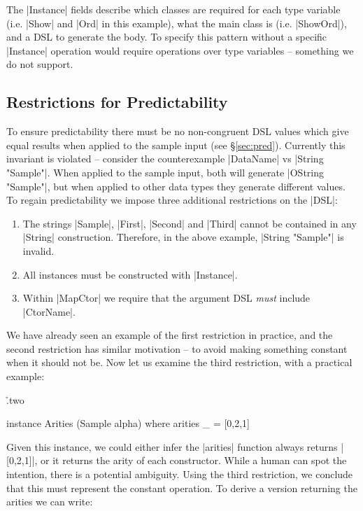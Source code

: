 \documentclass{llncs}
\begin{document}
The |Instance| fields describe which classes are required for each type variable (i.e. |Show| and |Ord| in this example), what the main class is (i.e. |ShowOrd|), and a DSL to generate the body. To specify this pattern without a specific |Instance| operation would require operations over type variables -- something we do not support.

\subsection{Restrictions for Predictability}
\label{sec:predictability}

To ensure predictability there must be no non-congruent DSL values which give equal results when applied to the sample input (see \S\ref{sec:pred}). Currently this invariant is violated -- consider the counterexample |DataName| vs |String "Sample"|. When applied to the sample input, both will generate |OString "Sample"|, but when applied to other data types they generate different values. To regain predictability we impose three additional restrictions on the |DSL|:

\begin{enumerate}
\item The strings |Sample|, |First|, |Second| and |Third| cannot be contained in any |String| construction. Therefore, in the above example, |String "Sample"| is invalid.
\item All instances must be constructed with |Instance|.
\item Within |MapCtor| we require that the argument DSL \textit{must} include |CtorName|.
\end{enumerate}

We have already seen an example of the first restriction in practice, and the second restriction has similar motivation -- to avoid making something constant when it should not be. Now let us examine the third restriction, with a practical example:

\h{.two}\begin{code}
instance Arities (Sample alpha) where
    arities _ = [0,2,1]
\end{code}

Given this instance, we could either infer the |arities| function always returns |[0,2,1]|, or it returns the arity of each constructor. While a human can spot the intention, there is a potential ambiguity. Using the third restriction, we conclude that this must represent the constant operation. To derive a version returning the arities we can write:
\end{document}
